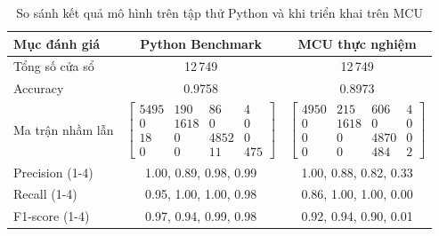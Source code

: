 \begin{table}[ht]
    \centering
    \caption{So sánh kết quả mô hình trên tập thử Python và khi triển khai trên MCU}
    \begin{tabular}{lcc}
        \hline
        \textbf{Mục đánh giá} & \textbf{Python Benchmark}   & \textbf{MCU thực nghiệm} \\
        \hline
        Tổng số cửa sổ        & 12\,749                     & 12\,749                  \\[4pt]

        Accuracy              & 0.9758                      & 0.8973                   \\[6pt]

        Ma trận nhầm lẫn      & $\begin{bmatrix}
                                         5495 & 190  & 86   & 4   \\
                                         0    & 1618 & 0    & 0   \\
                                         18   & 0    & 4852 & 0   \\
                                         0    & 0    & 11   & 475
                                     \end{bmatrix}$ &
        $\begin{bmatrix}
                 4950 & 215  & 606  & 4 \\
                 0    & 1618 & 0    & 0 \\
                 0    & 0    & 4870 & 0 \\
                 0    & 0    & 484  & 2
             \end{bmatrix}$                                                        \\[14pt]

        Precision (1-4)       & 1.00, 0.89, 0.98, 0.99      & 1.00, 0.88, 0.82, 0.33   \\[6pt]

        Recall (1-4)          & 0.95, 1.00, 1.00, 0.98      & 0.86, 1.00, 1.00, 0.00   \\[6pt]

        F1-score (1-4)        & 0.97, 0.94, 0.99, 0.98      & 0.92, 0.94, 0.90, 0.01   \\ \hline
    \end{tabular}
    \label{tiny_result}
\end{table}

